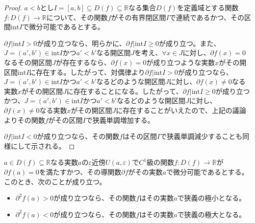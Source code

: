 \documentclass[dvipdfmx]{jsarticle}
\begin{document}
\begin{proof}
$a < b$とし$I = [ a,b] \subseteq D(f) \subseteq \mathbb{R}$なる集合$D(f)$を定義域とする関数$f:D(f) \rightarrow \mathbb{R}$について、その関数$f$がその有界閉区間$I$で連続であるかつ、その区間$\mathrm{int}I$で微分可能であるとする。\par
$\partial f|\mathrm{int}I > 0$が成り立つなら、明らかに、$\partial f|\mathrm{int}I \geq 0$が成り立つ。また、$J = \left( a',b' \right) \in \mathrm{int}I$かつ$a' < b'$なる開区間$J$を考え、$\forall x \in J$に対し、$\partial f(x) = 0$なるその開区間$J$が存在するなら、$\partial f(x) = 0$が成り立つような実数$x$がその開区間$\mathrm{int}I$に存在する。したがって、対偶律より$\partial f|\mathrm{int}I > 0$が成り立つなら、$J = \left( a',b' \right) \in \mathrm{int}I$かつ$a' < b'$なるどのような開区間$J$に対し、$\partial f(x) \neq 0$なる実数$x$がその開区間$J$に存在することになる。したがって、$\partial f|\mathrm{int}I \geq 0$が成り立つかつ、$J = \left( a',b' \right) \in \mathrm{int}I$かつ$a' < b'$なるどのような開区間$J$に対し、$\partial f(x) \neq 0$なる実数$x$がその開区間$J$に存在することがいえたので、上記の議論よりその関数$f$がその区間$I$で狭義単調増加する。\par
$\partial f|\mathrm{int}I < 0$が成り立つなら、その関数$f$はその区間$I$で狭義単調減少することも同様にして示される。
\end{proof}
\begin{thm}\label{4.2.2.8}
$a \in D(f) \subseteq \mathbb{R}$なる実数$a$の$\varepsilon$近傍$U(a,\varepsilon)$で$C^{1}$級の関数$f:D(f) \rightarrow \mathbb{R}$が$\partial f(a) = 0$を満たすかつ、その導関数$\partial f$がその実数$a$で微分可能であるとする。このとき、次のことが成り立つ。
\begin{itemize}
\item
  $\partial^{2}f(a) > 0$が成り立つなら、その関数$f$はその実数$a$で狭義の極小となる。
\item
  $\partial^{2}f(a) < 0$が成り立つなら、その関数$f$はその実数$a$で狭義の極大となる。
\end{itemize}
\end{thm}
\end{document}
